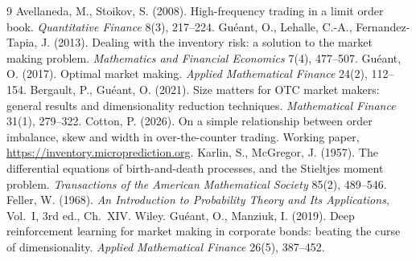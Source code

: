 \documentclass[11pt]{article}
\begin{document}
\begin{thebibliography}{9}
 Avellaneda, M., Stoikov, S. (2008). High-frequency trading in a limit order book. \emph{Quantitative Finance} 8(3), 217--224.
 Gu\'eant, O., Lehalle, C.-A., Fernandez-Tapia, J. (2013). Dealing with the inventory risk: a solution to the market making problem. \emph{Mathematics and Financial Economics} 7(4), 477--507.
 Gu\'eant, O. (2017). Optimal market making. \emph{Applied Mathematical Finance} 24(2), 112--154.
 Bergault, P., Gu\'eant, O. (2021). Size matters for OTC market makers: general results and dimensionality reduction techniques. \emph{Mathematical Finance} 31(1), 279--322.
 Cotton, P. (2026). On a simple relationship between order imbalance, skew and width in over-the-counter trading. Working paper, \url{https://inventory.microprediction.org}.
 Karlin, S., McGregor, J. (1957). The differential equations of birth-and-death processes, and the Stieltjes moment problem. \emph{Transactions of the American Mathematical Society} 85(2), 489--546.
 Feller, W. (1968). \emph{An Introduction to Probability Theory and Its Applications}, Vol.~I, 3rd ed., Ch.~XIV. Wiley.
 Gu\'eant, O., Manziuk, I. (2019). Deep reinforcement learning for market making in corporate bonds: beating the curse of dimensionality. \emph{Applied Mathematical Finance} 26(5), 387--452.
\end{thebibliography}
\end{document}
